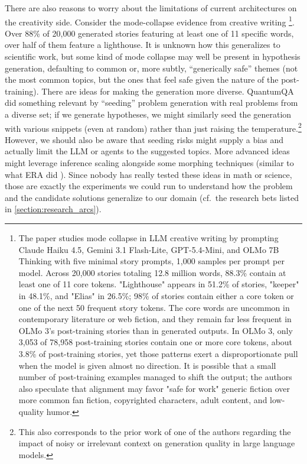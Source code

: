 There are also reasons to worry about the limitations of current architectures on the creativity side. Consider the mode-collapse evidence from creative writing \cite{2605.26492}\footnote{
    The paper studies mode collapse in LLM creative writing by prompting Claude Haiku 4.5, Gemini 3.1 Flash-Lite, GPT-5.4-Mini, and OLMo 7B Thinking with five minimal story prompts, 1,000 samples per prompt per model. Across 20,000 stories totaling 12.8 million words, 88.3\% contain at least one of 11 core tokens. "Lighthouse" appears in 51.2\% of stories, "keeper" in 48.1\%, and "Elias" in 26.5\%; 98\% of stories contain either a core token or one of the next 50 frequent story tokens.
    The core words are uncommon in contemporary literature or web fiction, and they remain far less frequent in OLMo 3's post-training stories than in generated outputs. In OLMo 3, only 3,053 of 78,958 post-training stories contain one or more core tokens, about 3.8\% of post-training stories, yet those patterns exert a disproportionate pull when the model is given almost no direction.
    It is possible that a small number of post-training examples managed to shift the output; the authors also speculate that alignment may favor "safe for work" generic fiction over more common fan fiction, copyrighted characters, adult content, and low-quality humor.
    }.
Over 88\% of 20{,}000 generated stories featuring at least one of 11 specific words, over half of them feature a lighthouse. It is unknown how this generalizes to scientific work, but some kind of mode collapse may well be present in hypothesis generation, defaulting to common or, more subtly, ``generically safe'' themes (not the most common topics, but the ones that feel safe given the nature of the post-training). There are ideas for making the generation more diverse. QuantumQA \cite{2604.18176} did something relevant by ``seeding'' problem generation with real problems from a diverse set; if we generate hypotheses, we might similarly seed the generation with various snippets (even at random) rather than just raising the temperature.\footnote{This also corresponds to the prior work of one of the authors regarding the impact of noisy or irrelevant context on generation quality in large language models.} However, we should also be aware that seeding risks might supply a bias and actually limit the LLM or agents to the suggested topics. More advanced ideas might leverage inference scaling alongside some morphing techniques (similar to what ERA did \cite{Aygn2026}). Since nobody has really tested these ideas in math or science, those are exactly the experiments we could run to understand how the problem and the candidate solutions generalize to our domain (cf.\ the research bets listed in \ref{section:research_arcs}).

